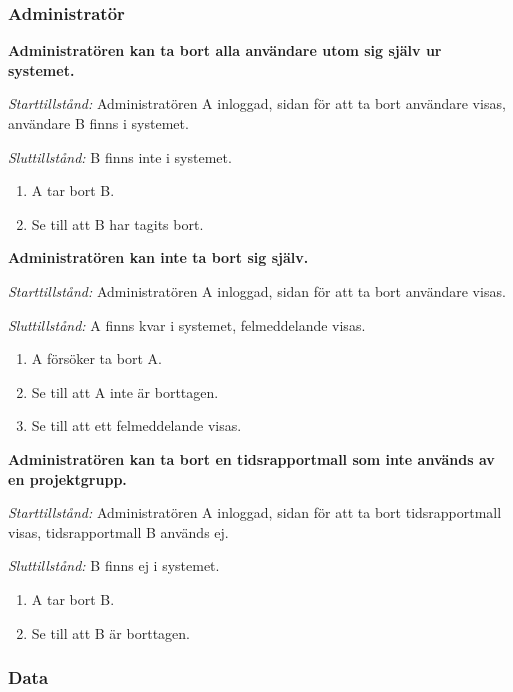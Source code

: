 \documentclass[a4paper]{article}
\begin{document}
\begin{FT}
\subsubsection{Administratör}

\item
\textbf{Administratören kan ta bort alla användare utom sig själv ur systemet.}

\emph{Starttillstånd:} Administratören A inloggad, sidan för att ta bort användare visas, användare B finns i systemet.

\emph{Sluttillstånd:} B finns inte i systemet.

\begin{enumerate}
\item A tar bort B.
\item Se till att B har tagits bort.

\end{enumerate}

\item
\textbf{Administratören kan inte ta bort sig själv.}

\emph{Starttillstånd:} Administratören A inloggad, sidan för att ta bort användare visas.

\emph{Sluttillstånd:} A finns kvar i systemet, felmeddelande visas.

\begin{enumerate}
\item A försöker ta bort A.
\item Se till att A inte är borttagen.
\item Se till att ett felmeddelande visas.
\end{enumerate}

\item
\textbf{Administratören kan ta bort en tidsrapportmall som inte används av en projektgrupp.}

\emph{Starttillstånd:} Administratören A inloggad, sidan för att ta bort tidsrapportmall visas, tidsrapportmall B används ej.

\emph{Sluttillstånd:} B finns ej i systemet.

\begin{enumerate}
\item A tar bort B.
\item Se till att B är borttagen.
\end{enumerate}

\subsubsection{Data}


\end{FT}
\end{document}
